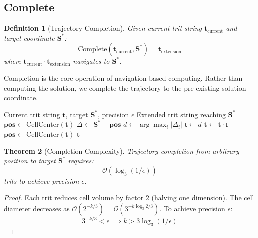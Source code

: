 \documentclass[twocolumn,10pt]{article}
\newtheorem{theorem}{Theorem}[section]
\newtheorem{definition}[theorem]{Definition}
\theoremstyle{remark}
\newcommand{\Scoord}{\mathbf{S}}
\newcommand{\tmark}{\mathsf{t}}
\newcommand{\bigO}{\mathcal{O}}
\begin{document}
\subsection{Complete}

\begin{definition}[Trajectory Completion]
Given current trit string $\mathbf{t}_{\text{current}}$ and target coordinate $\Scoord^*$:
\begin{equation}
\text{Complete}(\mathbf{t}_{\text{current}}, \Scoord^*) = \mathbf{t}_{\text{extension}}
\end{equation}
where $\mathbf{t}_{\text{current}} \cdot \mathbf{t}_{\text{extension}}$ navigates to $\Scoord^*$.
\end{definition}

Completion is the core operation of navigation-based computing. Rather than computing the solution, we complete the trajectory to the pre-existing solution coordinate.

\begin{algorithm}
\caption{Trajectory Completion}
\label{alg:complete}
\begin{algorithmic}[1]
\Require Current trit string $\mathbf{t}$, target $\Scoord^*$, precision $\epsilon$
\Ensure Extended trit string reaching $\Scoord^*$
\State $\mathbf{pos} \gets \text{CellCenter}(\mathbf{t})$
\While{$\|\mathbf{pos} - \Scoord^*\| > \epsilon$}
    \State $\Delta \gets \Scoord^* - \mathbf{pos}$
    \State $d \gets \arg\max_i |\Delta_i|$ 
    \State $\tmark \gets d$ 
    \State $\mathbf{t} \gets \mathbf{t} \cdot \tmark$ 
    \State $\mathbf{pos} \gets \text{CellCenter}(\mathbf{t})$
\EndWhile
\State \Return $\mathbf{t}$
\end{algorithmic}
\end{algorithm}

\begin{theorem}[Completion Complexity]
\label{thm:completion}
Trajectory completion from arbitrary position to target $\Scoord^*$ requires:
\begin{equation}
\bigO(\log_3(1/\epsilon))
\end{equation}
trits to achieve precision $\epsilon$.
\end{theorem}

\begin{proof}
Each trit reduces cell volume by factor 2 (halving one dimension). The cell diameter decreases as $\bigO(2^{-k/3}) = \bigO(3^{-k \log_3 2/3})$. To achieve precision $\epsilon$:
\begin{equation}
3^{-k/3} < \epsilon \implies k > 3\log_3(1/\epsilon)
\end{equation}
\end{proof}
\end{document}
